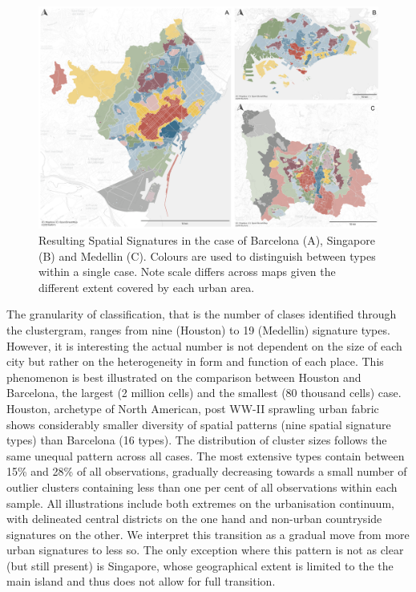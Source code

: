 \begin{figure}
    \includegraphics[width=\linewidth]{figures/maps1.png}
    \caption{Resulting Spatial Signatures in the case of Barcelona (A), Singapore (B)
    and Medellin (C). Colours are used to distinguish between types within a
    single case. Note scale differs across maps given the different extent
    covered by each urban area.}
    \label{fig:maps1}
\end{figure}

The granularity of classification, that is the number of clases identified
through the clustergram, ranges from nine (Houston) to 19 (Medellin) signature
types. However, it is interesting the actual number is not dependent on the size of each
city but rather on the heterogeneity in form and function of each place. This
phenomenon is best illustrated on the comparison
between Houston and Barcelona, the largest (2 million cells) and the smallest (80 thousand
cells) case. Houston, archetype of North American, post WW-II sprawling urban fabric shows
considerably smaller diversity of spatial patterns (nine spatial signature
types) than
Barcelona (16 types).
The distribution of cluster sizes follows the same unequal pattern across
all cases. The most extensive types contain between 15\% and 28\% of all
observations, gradually decreasing towards a small number of
outlier clusters containing less than one per cent of all observations within each sample.
All illustrations include both extremes on the urbanisation continuum, with delineated
central districts on the one hand and non-urban countryside signatures on the
other. We interpret this
transition as a gradual move from more urban signatures to less so. The only
exception where this pattern is not as clear (but
still present) is Singapore, whose geographical extent is limited to the
the main island and thus does not allow for full transition.

